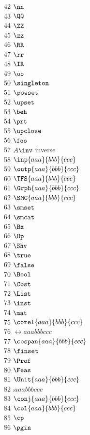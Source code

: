 \documentclass[11pt, book]{memoir}
\begin{document}
\begin{multicols}{3}
 42 $\nn$ \\
 43 $\QQ$ \\
 44 $\ZZ$ \\
 45 $\zz$ \\
 46 $\RR$ \\
 47 $\rr$ \\
 48 $\IR$ \\
 49 $\oo$ \\
 50 $\singleton$ \\
 51 $\powset$ \\
 52 $\upset$ \\
 53 $\beh$ \\
 54 $\prt$ \\
 55 $\upclose$ \\
 56 $\foo$ \\
 57 $A\inv$ inverse \\
 58 $\inp{aaa}{bbb}{ccc}$ \\
 59 $\outp{aaa}{bbb}{ccc}$ \\
 60 $\TFS{aaa}{bbb}{ccc}$ \\
 61 $\Grph{aaa}{bbb}{ccc}$ \\
 62 $\SMC{aaa}{bbb}{ccc}$ \\
 63 $\smset$ \\
 64 $\smcat$ \\
 65 $\Bx$ \\
 66 $\Op$ \\
 67 $\Shv$ \\
 68 $\true$ \\
 69 $\false$ \\
 70 $\Bool$ \\
 71 $\Cost$ \\
 72 $\List$ \\
 73 $\inst$ \\
 74 $\mat$ \\
 75 $\corel{aaa}{bbb}{ccc}$ \\
 76 $\rel{aaa}{bbb}{ccc}$ \\
 77 $\cospan{aaa}{bbb}{ccc}$ \\
 78 $\finset$ \\
 79 $\Prof$ \\
 80 $\Feas$ \\
 81 $\Unit{aaa}{bbb}{ccc}$ \\
 82 $\comp{aaa}{bbb}{ccc}$ \\
 83 $\conj{aaa}{bbb}{ccc}$ \\
 84 $\col{aaa}{bbb}{ccc}$ \\
 85 $\cp$ \\
 86 $\pgin$ \\

\end{multicols}
\end{document}
